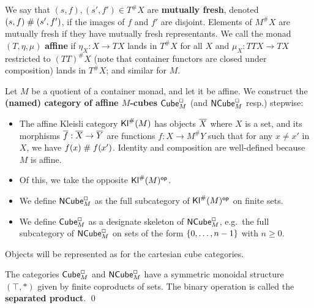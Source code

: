 \documentclass[a4paper]{memoir}
\begin{document}
We say that $(s, f), (s', f') \in T^\# X$ are \textbf{mutually fresh}, denoted $(s, f) \mathrel{\#} (s', f')$, if the images of $f$ and $f'$ are disjoint.
Elements of $M^\# X$ are mutually fresh if they have mutually fresh representants.
We call the monad $(T, \eta, \mu)$ \textbf{affine} if $\eta_X : X \to TX$ lands in $T^\# X$ for all $X$ and $\mu_X : TTX \to TX$ restricted to $(TT)^\# X$ (note that container functors are closed under composition) lands in $T^\# X$; and similar for $M$.

\begin{definition}
Let $M$ be a quotient of a container monad, and let it be affine.
We construct the \textbf{(named) category of affine $M$-cubes ${\mathsf{Cube}}_M^\Box$} (and ${\mathsf{NCube}}_M^\Box$ resp.) stepwise:
\begin{itemize}
	\item The affine Kleisli category ${\mathsf{Kl}}^\#(M)$ has objects ${\overline{X}}$ where $X$ is a set, and its morphisms ${\overline{f}} : {\overline{X}} \to {\overline{Y}}$ are functions $f : X \to M^\#Y$ such that for any $x \neq x'$ in $X$, we have $f(x) \mathrel{\#} f(x')$.
	Identity and composition are well-defined because $M$ is affine.
	\item Of this, we take the opposite ${\mathsf{Kl}}^\#(M)^{\mathsf{op}}$.
	\item We define ${\mathsf{NCube}}_M^\Box$ as the full subcategory of ${\mathsf{Kl}}^\#(M)^{\mathsf{op}}$ on finite sets.
	\item We define ${\mathsf{Cube}}_M^\Box$ as a designate skeleton of ${\mathsf{NCube}}^\Box_M$, e.g.\ the full subcategory of ${\mathsf{NCube}}^\Box_M$ on sets of the form $\mathopen{}\left\{ 0, \ldots, n-1 \right\}\mathclose{}$ with $n \geq 0$.
\end{itemize}
\end{definition}
Objects will be represented as for the cartesian cube categories.

\begin{corollary}
The categories ${\mathsf{Cube}}^\Box_M$ and ${\mathsf{NCube}}^\Box_M$ have a symmetric monoidal structure $(\top, {*})$ given by finite coproducts of sets. The binary operation is called the \textbf{separated product}. \qed
\end{corollary}
\end{document}
